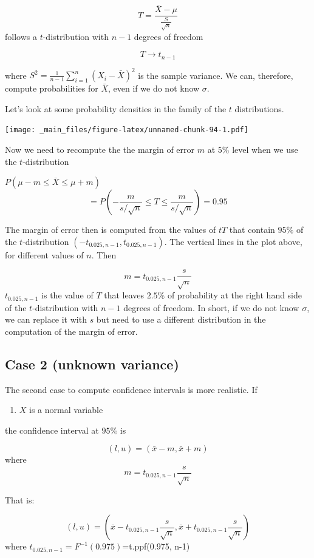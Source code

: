 \documentclass[
]{book}
\providecommand{\tightlist}{%
  \setlength{\itemsep}{0pt}\setlength{\parskip}{0pt}}
\begin{document}
\[T=\frac{\bar{X}-\mu}{\frac{S}{\sqrt{n}}}\]
follows a \(t\)-distribution with \(n-1\) degrees of freedom

\[T \rightarrow t_{n-1}\]

where \(S^2=\frac{1}{n-1} \sum_{i=1}^n (X_i-\bar{X})^2\) is the sample variance. We can, therefore, compute probabilities for \(\bar{X}\), even if we do not know \(\sigma\).

Let's look at some probability densities in the family of the \(t\) distributions.

\texttt{[image: \_main\_files/figure-latex/unnamed-chunk-94-1.pdf]}

Now we need to recompute the the margin of error \(m\) at \(5\%\) level when we use the \(t\)-distribution

\(P(\mu-m \leq \bar{X} \leq\mu + m)\)
\[=P(-\frac{m}{s/\sqrt{n}} \leq T \leq\frac{m}{s/\sqrt{n}})=0.95\]

The margin of error then is computed from the values of \(tT\) that contain \(95\%\) of the \(t\)-distribution \((-t_{0.025, n-1},t_{0.025, n-1})\). The vertical lines in the plot above, for different values of \(n\). Then

\[m=t_{0.025, n-1} \frac{s}{\sqrt{n}}\]
\(t_{0.025, n-1}\) is the value of \(T\) that leaves \(2.5\%\) of probability at the right hand side of the \(t\)-distribution with \(n-1\) degrees of freedom. In short, if we do not know \(\sigma\), we can replace it with \(s\) but need to use a different distribution in the computation of the margin of error.

\hypertarget{case-2-unknown-variance}{%
\subsection{Case 2 (unknown variance)}\label{case-2-unknown-variance}}

The second case to compute confidence intervals is more realistic. If

\begin{enumerate}
\def\labelenumi{\arabic{enumi}.}
\tightlist
\item
  \(X\) is a normal variable
\end{enumerate}

the confidence interval at \(95\%\) is

\[(l,u)=(\bar{x} - m, \bar{x} + m)\]
where \[m=t_{0.025, n-1} \frac{s}{\sqrt{n}}\]

That is:

\[(l,u)=(\bar{x} - t_{0.025, n-1} \frac{s}{\sqrt{n}}, \bar{x} + t_{0.025, n-1} \frac{s}{\sqrt{n}})\]
where \(t_{0.025, n-1}=F^{-1}(0.975)\)=t.ppf(0.975, n-1)
\end{document}
